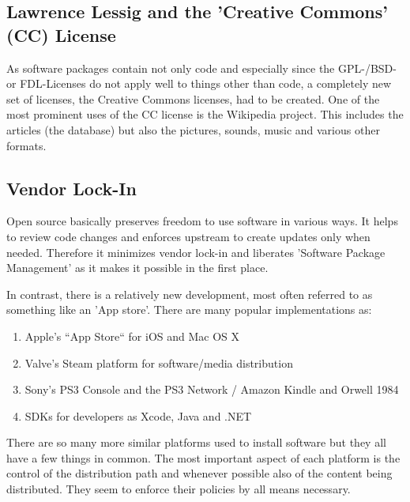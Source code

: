 \documentclass[a4paper,10pt]{article}
\begin{document}
\subsection{Lawrence Lessig and the 'Creative Commons' (CC) License}
As software packages contain not only code and especially since the GPL-/BSD- or FDL-Licenses do not apply well to things other than code, a completely new set of licenses, the Creative Commons licenses, had to be created. One of the most prominent uses of the CC license is the Wikipedia project. This includes the articles (the database) but also the pictures, sounds, music and various other formats.

\subsection{Vendor Lock-In}
Open source basically preserves freedom to use software in various ways. It helps to review code changes and enforces upstream to create updates only when needed. Therefore it minimizes vendor lock-in and liberates 'Software Package Management' as it makes it possible in the first place.

In contrast, there is a relatively new development, most often referred to as something like an 'App store'. There are many popular implementations as:
\begin{enumerate}
 \item Apple's ``App Store`` for iOS and Mac OS X
 \item Valve's Steam platform for software/media distribution
 \item Sony's PS3 Console and the PS3 Network  /  Amazon Kindle and Orwell 1984
 \item SDKs for developers as Xcode, Java and .NET
\end{enumerate}

There are so many more similar platforms used to install software but they all have a few things in common. The most important aspect of each platform is the control of the distribution path and whenever possible also of the content being distributed. They seem to enforce their policies by all means necessary.
\end{document}
